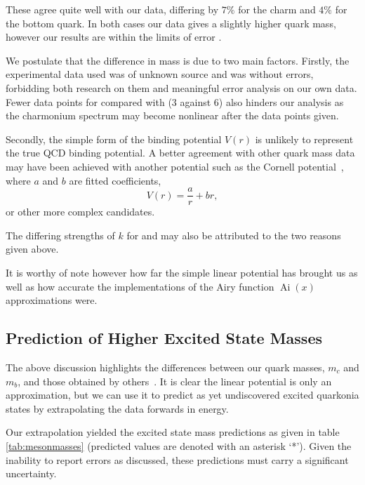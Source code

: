 \documentclass[]{article}
\newcommand{\Ai}[1]{\ensuremath{\operatorname{Ai}({#1})}}
\begin{document}

These agree quite well with our data, differing by $7\%$ for the charm and $4\%$ for the bottom quark. In both cases our data gives a slightly higher quark mass, however our results are within the limits of error .

We postulate that the difference in mass is due to two main factors. Firstly, the experimental data used was of unknown source and was without errors, forbidding both research on them and meaningful error analysis on our own data. Fewer data points for \ccbar compared with \bbbar (3 against 6) also hinders our analysis as the charmonium spectrum may become nonlinear after the data points given.

Secondly, the simple form of the binding potential $V(r)$ is unlikely to represent the true QCD binding potential. A better agreement with other quark mass data may have been achieved with another potential such as the Cornell potential~\cite{ref:eichten}, where $a$ and $b$ are fitted coefficients,
\[
V(r) = \frac{a}{r} + br,
\]
or other more complex candidates.

The differing strengths of $k$ for \ccbar and \bbbar may also be attributed to the two reasons given above.

It is worthy of note however how far the simple linear potential has brought us as well as how accurate the implementations of the Airy function $\Ai{x}$ approximations were.

\subsection{Prediction of Higher Excited State Masses}\label{ssec:highermasses}

The above discussion highlights the differences between our quark masses, $m_{c}$ and $m_{b}$, and those obtained by others~\cite{ref:pdg}. It is clear the linear potential is only an approximation, but we can use it to predict as yet undiscovered excited quarkonia states by extrapolating the data forwards in energy.

Our extrapolation yielded the excited state mass predictions as given in table \ref{tab:mesonmasses} (predicted values are denoted with an asterisk `*'). Given the inability to report errors as discussed, these predictions must carry a significant uncertainty.
\end{document}
